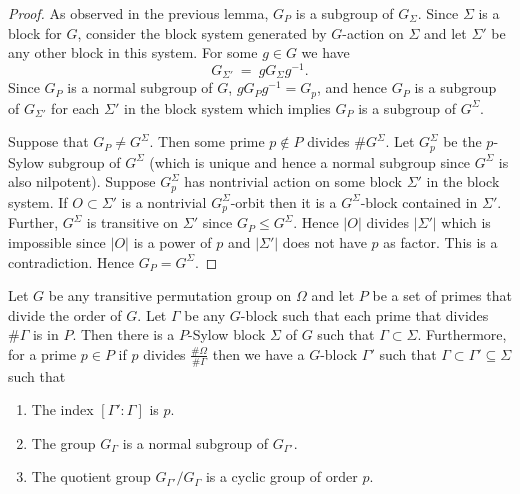 \documentclass[prodmod,acmtalg]{acmsmall}
\begin{document}
\begin{proof}
  As observed in the previous lemma, $G_P$ is a subgroup of
  $G_\Sigma$.  Since $\Sigma$ is a block for $G$, consider the block
  system generated by $G$-action on $\Sigma$ and let $\Sigma'$ be any
  other block in this system. For some $g\in G$ we have
\[
G_{\Sigma'} ~=~gG_\Sigma g^{-1}.
\]
Since $G_P$ is a normal subgroup of $G$, $gG_Pg^{-1}=G_p$, and hence
$G_P$ is a subgroup of $G_{\Sigma'}$ for each $\Sigma'$ in the block
system which implies $G_P$ is a subgroup of $G^\Sigma$.

Suppose that $G_P\neq G^\Sigma$. Then some prime $p\not\in P$ divides
$\# G^\Sigma$. Let $G^\Sigma_p$ be the $p$-Sylow subgroup of
$G^\Sigma$ (which is unique and hence a normal subgroup since
$G^\Sigma$ is also nilpotent). Suppose $G^\Sigma_p$ has nontrivial
action on some block $\Sigma'$ in the block system. If $O\subset
\Sigma'$ is a nontrivial $G^\Sigma_p$-orbit then it is a
$G^\Sigma$-block contained in $\Sigma'$. Further, $G^\Sigma$ is
transitive on $\Sigma'$ since $G_P\leq G^\Sigma$. Hence $|O|$ divides
$|\Sigma'|$ which is impossible since $|O|$ is a power of $p$ and
$|\Sigma'|$ does not have $p$ as factor. This is a
contradiction. Hence $G_P= G^\Sigma$.
\end{proof}

\begin{theorem}\label{thm-gen-if-g-nilpotent}
  Let $G$ be any transitive permutation group on $\Omega$ and let $P$
  be a set of primes that divide the order of $G$. Let $\Gamma$ be any
  $G$-block such that each prime that divides $\# \Gamma$ is in
  $P$. Then there is a $P$-Sylow block $\Sigma$ of $G$ such that
  $\Gamma \subset \Sigma$. Furthermore, for a prime $p \in P$ if $p$
  divides $\frac{\# \Omega}{\# \Gamma}$ then we have a $G$-block
  $\Gamma'$ such that $\Gamma\subset \Gamma'\subseteq \Sigma$ such that
  \begin{enumerate}
  \item The index $[\Gamma': \Gamma]$ is $p$.
  \item The group $G_\Gamma$ is a normal subgroup of $G_{\Gamma'}$.
  \item The quotient group $G_{\Gamma'}/G_{\Gamma}$ is a cyclic group
    of order $p$.
  \end{enumerate}
\end{theorem}
\end{document}
